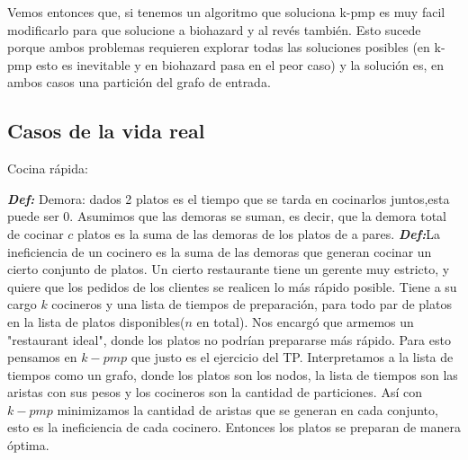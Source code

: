 \documentclass[a4paper]{article}
\begin{document}
\newline Vemos entonces que, si tenemos un algoritmo que soluciona k-pmp es muy facil modificarlo para que solucione a biohazard y al revés también. Esto sucede porque ambos problemas requieren explorar todas las soluciones posibles (en k-pmp esto es inevitable y en biohazard pasa en el peor caso) y la solución es, en ambos casos una partición del grafo de entrada.

\subsection{Casos de la vida real}
\begin{center}
Cocina rápida:
\end{center}
\textit{\textbf{Def:}} Demora: dados 2 platos es el tiempo que se tarda en cocinarlos juntos,esta puede ser 0. Asumimos que las demoras se suman, es decir, que la demora total de cocinar $c$ platos es la suma de las demoras de los platos de a pares.\newline
\textit{\textbf{Def:}}La ineficiencia de un cocinero es la suma de las demoras que generan cocinar un cierto conjunto de platos.\newline  
Un cierto restaurante tiene un gerente muy estricto, y quiere que los pedidos de los clientes se realicen lo más rápido posible. Tiene a su cargo $k$ cocineros y una lista de tiempos de preparación, para todo par de platos en la lista de platos disponibles($n$ en total).
Nos encargó que armemos un "restaurant ideal", donde los platos no podrían prepararse más rápido. Para esto pensamos en $k-pmp$ que justo es el ejercicio del TP.
Interpretamos a la lista de tiempos como un grafo, donde los platos son los nodos, la lista de tiempos son las aristas con sus pesos y los cocineros son la cantidad de particiones. \newline
Así con $k-pmp$ minimizamos la cantidad de aristas que se generan en cada conjunto, esto es la ineficiencia de cada cocinero. Entonces los platos se preparan de manera óptima.
\end{document}
